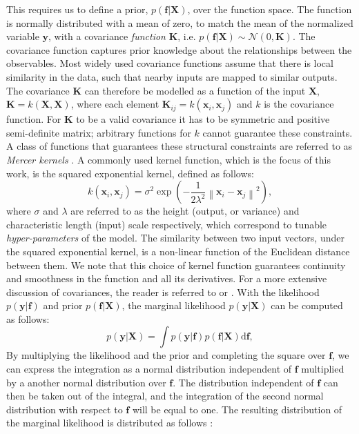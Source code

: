 \documentclass[useAMS,usenatbib,fleqn]{mn2e}
\begin{document}
This requires us to define a prior, $p\left(\mathbf{f}|\mathbf{X}\right)$, over the function space. The function is normally distributed with a mean of zero, to match the mean of the normalized variable $\mathbf{y}$, with a covariance \emph{function} $\mathbf{K}$, i.e. $p\left(\mathbf{f}|\mathbf{X}\right)\sim\mathcal{N} \left(0,\mathbf{K}\right)$. The covariance function captures prior knowledge about the relationships between the observables. Most widely used covariance functions assume that there is local similarity in the data, such that nearby inputs are mapped to similar outputs. The covariance $\mathbf{K}$ can therefore be modelled as a function of the input $\mathbf{X}$, $\mathbf{K}=k\left(\mathbf{X},\mathbf{X}\right)$, where each element $\mathbf{K}_{ij}=k\left(\mathbf{x}_{i},\mathbf{x}_{j}\right)$ and $k$ is the covariance function. For $\mathbf{K}$ to be a valid covariance it has to be symmetric and positive semi-definite matrix; arbitrary functions for $k$ cannot guarantee these constraints. A class of functions that guarantees these structural constraints are referred to as \emph{Mercer kernels} \citep{mercer1909}. A commonly used kernel function, which is the focus of this work, is the squared exponential kernel, defined as follows:
\begin{equation}
k\left(\mathbf{x}_{i},\mathbf{x}_{j}\right) = \sigma^{2}\exp\left(-\frac{1}{2\lambda^{2}}\left\|\mathbf{x}_{i}-\mathbf{x}_{j}\right\|^{2}\right),
\label{eq-squared-exponential}
\end{equation}
where $\sigma$ and $\lambda$ are referred to as the height (output, or variance) and characteristic length (input) scale respectively, which correspond to tunable \emph{hyper-parameters} of the model. The similarity between two input vectors, under the squared exponential kernel, is a non-linear function of the Euclidean distance between them. We note that this choice of kernel function guarantees continuity and smoothness in the function and all its derivatives. For a more extensive discussion of covariances, the reader is referred to \citep{rasmussen2006gaussian} or \citep{roberts2012rs}. With the likelihood $p\left(\mathbf{y}|\mathbf{f}\right)$ and prior $p\left(\mathbf{f}|\mathbf{X}\right)$, the marginal likelihood $p\left(\mathbf{y}|\mathbf{X}\right)$ can be computed as follows:
\begin{equation}
p\left(\mathbf{y}|\mathbf{X}\right) = \int p\left(\mathbf{y}|\mathbf{f}\right)p\left(\mathbf{f}|\mathbf{X}\right) \mathrm{d}\mathbf{f},
\end{equation}
By multiplying the likelihood and the prior and completing the square over $\mathbf{f}$, we can express the integration as a normal distribution independent of $\mathbf{f}$ multiplied by a another normal distribution over $\mathbf{f}$. The distribution independent of $\mathbf{f}$ can then be taken out of the integral, and the integration of the second normal distribution with respect to $\mathbf{f}$ will be equal to one. The resulting distribution of the marginal likelihood is distributed as follows \citep{rasmussen2006gaussian}:
\end{document}
